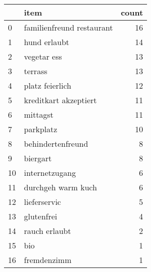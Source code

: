 \begin{tabular}{llr}
\toprule
{} &                       item &  count \\
\midrule
0  &  familienfreund restaurant &     16 \\
1  &               hund erlaubt &     14 \\
2  &                vegetar ess &     13 \\
3  &                    terrass &     13 \\
4  &            platz feierlich &     12 \\
5  &      kreditkart akzeptiert &     11 \\
6  &                   mittagst &     11 \\
7  &                  parkplatz &     10 \\
8  &          behindertenfreund &      8 \\
9  &                   biergart &      8 \\
10 &             internetzugang &      6 \\
11 &         durchgeh warm kuch &      6 \\
12 &               lieferservic &      5 \\
13 &                 glutenfrei &      4 \\
14 &              rauch erlaubt &      2 \\
15 &                        bio &      1 \\
16 &                fremdenzimm &      1 \\
\bottomrule
\end{tabular}
